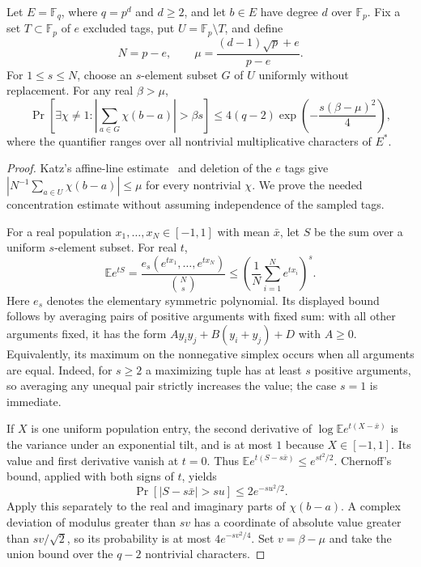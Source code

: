 \begin{lemma}\label{lem:random-tag-character-bias}
Let $E=\mathbb F_q$, where $q=p^d$ and $d\ge2$, and let
$b\in E$ have degree $d$ over $\mathbb F_p$.
Fix a set $T\subset\mathbb F_p$ of $e$ excluded tags, put
$U=\mathbb F_p\setminus T$, and define
\[
 N=p-e,\qquad \mu=\frac{(d-1)\sqrt p+e}{p-e}.
\]
For $1\le s\le N$, choose an $s$-element subset $G$ of $U$ uniformly
without replacement.  For any real $\beta>\mu$,
\[
 \Pr\left[\exists\chi\ne1:
   \left|\sum_{a\in G}\chi(b-a)\right|>\beta s\right]
 \le 4(q-2)\exp\left(-\frac{s(\beta-\mu)^2}{4}\right),
\]
where the quantifier ranges over all nontrivial multiplicative characters
of $E^*$.
\end{lemma}
\begin{proof}
Katz's affine-line estimate~\cite[Theorem~1]{katz1989-character-sums}
and deletion of the $e$ tags give
$|N^{-1}\sum_{a\in U}\chi(b-a)|\le\mu$ for every nontrivial $\chi$.
We prove the needed concentration estimate without assuming independence
of the sampled tags.

For a real population $x_1,\ldots,x_N\in[-1,1]$ with mean $\bar x$,
let $S$ be the sum over a uniform $s$-element subset.  For real $t$,
\[
 \mathbb E e^{tS}
 =\frac{e_s(e^{tx_1},\ldots,e^{tx_N})}{\binom Ns}
 \le\left(\frac1N\sum_{i=1}^N e^{tx_i}\right)^s.
\]
Here $e_s$ denotes the elementary symmetric polynomial.  Its displayed
bound follows by averaging pairs of positive arguments with fixed sum:
with all other arguments fixed, it has the form
$A y_i y_j+B(y_i+y_j)+D$ with $A\ge0$.
Equivalently, its maximum on the nonnegative simplex occurs when all
arguments are equal.  Indeed, for $s\ge2$ a maximizing tuple has at least
$s$ positive arguments, so averaging any unequal pair strictly increases
the value; the case $s=1$ is immediate.

If $X$ is one uniform population entry, the second derivative of
$\log\mathbb E e^{t(X-\bar x)}$ is the variance under an exponential
tilt, and is at most $1$ because $X\in[-1,1]$.  Its value and first
derivative vanish at $t=0$.  Thus
$\mathbb E e^{t(S-s\bar x)}\le e^{st^2/2}$.
Chernoff's bound, applied with both signs of $t$, yields
\[
 \Pr[|S-s\bar x|>su]\le2e^{-su^2/2}.
\]
Apply this separately to the real and imaginary parts of
$\chi(b-a)$.  A complex deviation of modulus greater than $sv$ has
a coordinate of absolute value greater than $sv/\sqrt2$, so its
probability is at most $4e^{-sv^2/4}$.
Set $v=\beta-\mu$ and take the union bound over the $q-2$ nontrivial
characters.
\end{proof}

